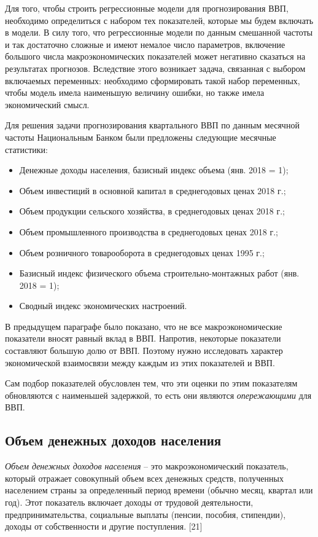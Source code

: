 \documentclass[a4paper, 14pt]{extreport}
\numberwithin{equation}{section}
\numberwithin{equation}{section}
\begin{document}
	Для того, чтобы строить регрессионные модели для прогнозирования ВВП, необходимо определиться с набором тех показателей, которые мы будем включать в модели. В силу того, что регрессионные модели по данным смешанной частоты и так достаточно сложные и имеют немалое число параметров, включение большого числа макроэкономических показателей может негативно сказаться на результатах прогнозов. Вследствие этого возникает задача, связанная с выбором включаемых переменных: необходимо сформировать такой набор переменных, чтобы модель имела наименьшую величину ошибки, но также имела экономический смысл.
	
	Для решения задачи прогнозирования квартального ВВП по данным месячной частоты Национальным Банком были предложены следующие месячные статистики:
	\begin{itemize}
		\item Денежные доходы населения, базисный индекс объема (янв. 2018 = 1);
		\item Объем инвестиций в основной капитал в среднегодовых ценах 2018 г.;
		\item Объем продукции сельского хозяйства, в среднегодовых ценах 2018 г.;
		\item Объем промышленного производства в среднегодовых ценах 2018 г.;
		\item Объем розничного товарооборота в среднегодовых ценах 1995 г.;
		\item Базисный индекс физического объема строительно-монтажных работ (янв. 2018 = 1);
		\item Сводный индекс экономических настроений.
	\end{itemize}
	
	В предыдущем параграфе было показано, что не все макроэкономические показатели вносят равный вклад в ВВП. Напротив, некоторые показатели составляют большую долю от ВВП. 
	Поэтому нужно исследовать характер экономической взаимосвязи между каждым из этих показателей и ВВП.
	
	Сам подбор показателей обусловлен тем, что эти оценки по этим показателям обновляются с наименьшей задержкой, то есть они являются \textit{опережающими} для ВВП.
	
	\subsection{Объем денежных доходов населения}
	
	\textit{Объем денежных доходов населения} -- это макроэкономический показатель, который отражает совокупный объем всех денежных средств, полученных населением страны за определенный период времени (обычно месяц, квартал или год). Этот показатель включает доходы от трудовой деятельности, предпринимательства, социальные выплаты (пенсии, пособия, стипендии), доходы от собственности и другие поступления. [21]
	
\end{document}
